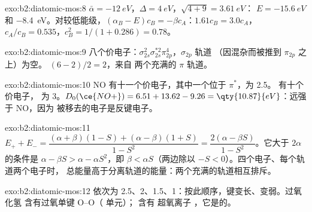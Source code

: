 \begin{solution}{exo:b2:diatomic-mos:8}
$\bar\alpha = \qty{-12}{eV}$，$\Delta = \qty{4}{eV}$，$\sqrt{4 + 9} = \qty{3.61}{eV}$：
$E = \qty{-15.6}{eV}$ 和 \qty{-8.4}{eV}。对较低能级，$(\alpha_B - E)c_B = -\beta
c_A$：$1.61c_B = 3.0c_A$，$c_A/c_B = 0.535$，$c_B^2 = 1/(1 + 0.286) = 0.78$。
\end{solution}

\begin{solution}{exo:b2:diatomic-mos:9}
八个价电子：$\sigma_{2s}^2\sigma_{2s}^{*2}\pi_{2p}^4$，$\sigma_{2p}$ 轨道
（因混杂而被推到 $\pi_{2p}$ 之上）为空。 $(6 - 2)/2 = 2$，来自
两个充满的 $\pi$ 轨道。
\end{solution}

\begin{solution}{exo:b2:diatomic-mos:10}
NO 有十一个价电子，其中一个位于 $\pi^*$，为 2.5。 有十个价电子，
为 3。$D_0(\ce{NO+}) = 6.51 + 13.62 - 9.26 = \qty{10.87}{eV}$：远强于 NO，因为
被移去的电子是反键电子。
\end{solution}

\begin{solution}{exo:b2:diatomic-mos:11}
$E_+ + E_- = \dfrac{(\alpha + \beta)(1 - S) + (\alpha - \beta)(1 + S)}{1 - S^2} = \dfrac{2(\alpha -
\beta S)}{1 - S^2}$。它大于 $2\alpha$ 的条件是 $\alpha - \beta S > \alpha - \alpha S^2$，即
$\beta < \alpha S$（两边除以 $-S < 0$）。四个电子、每个轨道两个电子时，
总能量高于分离轨道的能量：两个充满的轨道相互排斥。
\end{solution}

\begin{solution}{exo:b2:diatomic-mos:12}
依次为 2.5、2、1.5、1：按此顺序，键变长、变弱。过氧化氢
含有过氧单键 O--O（ 单元）； 含有
超氧离子 ，它是的。
\end{solution}

